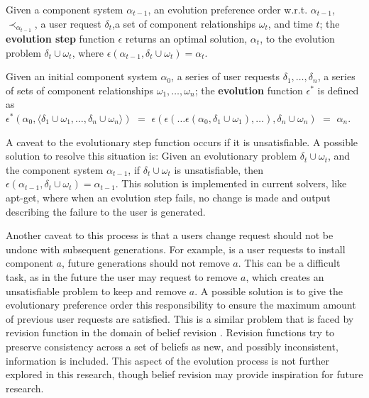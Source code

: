 \begin{defs}
Given a component system $\alpha_{t-1}$, an evolution preference order w.r.t. $\alpha_{t-1}$, $\prec_{\alpha_{t-1}}$, 
a user request $\delta_t$,a set of component relationships $\omega_t$, and time $t$;
the \textbf{evolution step} function $\epsilon$ returns an optimal solution, $\alpha_t$, to the evolution problem $\delta_t \cup \omega_t$, 
where $\epsilon(\alpha_{t-1},\delta_t \cup \omega_t) = \alpha_t$.
\end{defs}

\begin{defs}
Given an initial component system $\alpha_{0}$, a series of user requests $\delta_1,\ldots,\delta_{n}$, a series of sets of component relationships $\omega_1,\ldots,\omega_{n}$;
the \textbf{evolution} function $\epsilon^*$ is defined as\\
$\epsilon^*(\alpha_0,\langle \delta_1 \cup \omega_1,\ldots,\delta_{n} \cup \omega_n \rangle)$ $=$ $\epsilon(\epsilon(\ldots \epsilon(\alpha_0,\delta_1 \cup \omega_1),\ldots),\delta_n \cup \omega_n)$
$=$ $\alpha_n$.
\end{defs}

A caveat to the evolutionary step function occurs if it is unsatisfiable.
A possible solution to resolve this situation is:
Given an evolutionary problem $\delta_t \cup \omega_t$, and the component system $\alpha_{t-1}$, if $\delta_t \cup \omega_t$ is unsatisfiable, 
then $\epsilon(\alpha_{t-1},\delta_t \cup \omega_t) = \alpha_{t-1}$.
This solution is implemented in current solvers, like apt-get,
where when an evolution step fails, no change is made and output describing the failure to the user is generated. 

Another caveat to this process is that a users change request should not be undone with subsequent generations.
For example, is a user requests to install component $a$, future generations should not remove $a$.
This can be a difficult task, as in the future the user may request to remove $a$, which creates an unsatisfiable problem to keep and remove $a$.
A possible solution is to give the evolutionary preference order this responsibility to ensure the maximum amount of previous user requests are satisfied.
This is a similar problem that is faced by revision function in the domain of belief revision \citep{alchourron1985logic}.
Revision functions try to preserve consistency across a set of beliefs as new, and possibly inconsistent, information is included. 
This aspect of the evolution process is not further explored in this research, though belief revision may provide inspiration for future research.

